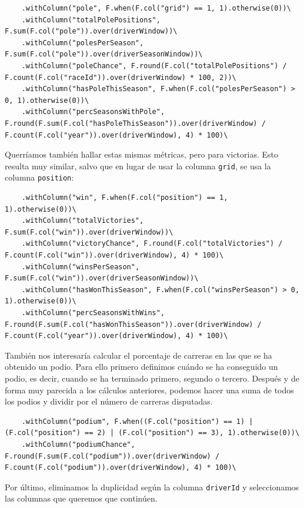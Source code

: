 \documentclass[12pt,twoside,titlepage]{report}
\begin{document}
\begin{lstlisting}
	.withColumn("pole", F.when(F.col("grid") == 1, 1).otherwise(0))\
	.withColumn("totalPolePositions", F.sum(F.col("pole")).over(driverWindow))\
	.withColumn("polesPerSeason", F.sum(F.col("pole")).over(driverSeasonWindow))\
	.withColumn("poleChance", F.round(F.col("totalPolePositions") / F.count(F.col("raceId")).over(driverWindow) * 100, 2))\
	.withColumn("hasPoleThisSeason", F.when(F.col("polesPerSeason") > 0, 1).otherwise(0))\
	.withColumn("percSeasonsWithPole", F.round(F.sum(F.col("hasPoleThisSeason")).over(driverWindow) / F.count(F.col("year")).over(driverWindow), 4) * 100)\
\end{lstlisting}

Querríamos también hallar estas mismas métricas, pero para victorias. Esto resulta muy similar, salvo que en lugar de usar la columna \texttt{grid}, se usa la columna \texttt{position}:

\begin{lstlisting}
	.withColumn("win", F.when(F.col("position") == 1, 1).otherwise(0))\
	.withColumn("totalVictories", F.sum(F.col("win")).over(driverWindow))\
	.withColumn("victoryChance", F.round(F.col("totalVictories") / F.count(F.col("win")).over(driverWindow), 4) * 100)\
	.withColumn("winsPerSeason", F.sum(F.col("win")).over(driverSeasonWindow))\
	.withColumn("hasWonThisSeason", F.when(F.col("winsPerSeason") > 0, 1).otherwise(0))\
	.withColumn("percSeasonsWithWins", F.round(F.sum(F.col("hasWonThisSeason")).over(driverWindow) / F.count(F.col("year")).over(driverWindow), 4) * 100)\
\end{lstlisting}

También nos interesaría calcular el porcentaje de carreras en las que se ha obtenido un podio. Para ello primero definimos cuándo se ha conseguido un podio, es decir, cuando se ha terminado primero, segundo o tercero. Después y de forma muy parecida a los cálculos anteriores, podemos hacer una suma de todos los podios y dividir por el número de carreras disputadas.

\begin{lstlisting}
	.withColumn("podium", F.when((F.col("position") == 1) | (F.col("position") == 2) | (F.col("position") == 3), 1).otherwise(0))\
	.withColumn("podiumChance", F.round(F.sum(F.col("podium")).over(driverWindow) / F.count(F.col("podium")).over(driverWindow), 4) * 100)\
\end{lstlisting}

Por último, eliminamos la duplicidad según la columna \texttt{driverId} y seleccionamos las columnas que queremos que continúen.
\end{document}
